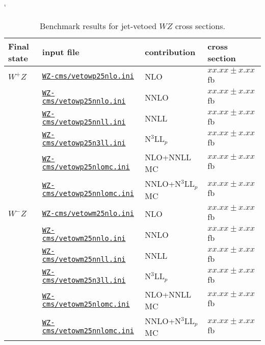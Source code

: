 `\renewcommand{\arraystretch}{1.05}
\begin{table}
\begin{tabular}{llll}
\hline
Final state & input file & contribution & cross section \\
\hline
\hline
$W^+Z$
& \href{\mcfmprocs/Files71/jetveto/cms/vetowp25nlo.ini}{\texttt{WZ-cms/vetowp25nlo.ini}}        & NLO                 & $xx.xx \pm x.xx$ fb \\
& \href{\mcfmprocs/Files71/jetveto/cms/vetowp25nnlo.ini}{\texttt{WZ-cms/vetowp25nnlo.ini}}      & NNLO                & $xx.xx \pm x.xx$ fb \\
& \href{\mcfmprocs/Files71/jetveto/cms/vetowp25nnll.ini}{\texttt{WZ-cms/vetowp25nnll.ini}}      & NNLL                & $xx.xx \pm x.xx$ fb \\
& \href{\mcfmprocs/Files71/jetveto/cms/vetowp25n3ll.ini}{\texttt{WZ-cms/vetowp25n3ll.ini}}      & N$^3$LL$_p$         & $xx.xx \pm x.xx$ fb \\
& \href{\mcfmprocs/Files71/jetveto/cms/vetowp25nlomc.ini}{\texttt{WZ-cms/vetowp25nlomc.ini}}    & NLO+NNLL MC         & $xx.xx \pm x.xx$ fb \\
& \href{\mcfmprocs/Files71/jetveto/cms/vetowp25nnlomc.ini}{\texttt{WZ-cms/vetowp25nnlomc.ini}}  & NNLO+N$^3$LL$_p$ MC & $xx.xx \pm x.xx$ fb \\[2pt]
\hline
$W^-Z$
& \href{\mcfmprocs/Files76/jetveto/cms/vetowm25nlo.ini}{\texttt{WZ-cms/vetowm25nlo.ini}}        & NLO                 & $xx.xx \pm x.xx$ fb \\
& \href{\mcfmprocs/Files76/jetveto/cms/vetowm25nnlo.ini}{\texttt{WZ-cms/vetowm25nnlo.ini}}      & NNLO                & $xx.xx \pm x.xx$ fb \\
& \href{\mcfmprocs/Files76/jetveto/cms/vetowm25nnll.ini}{\texttt{WZ-cms/vetowm25nnll.ini}}      & NNLL                & $xx.xx \pm x.xx$ fb \\
& \href{\mcfmprocs/Files76/jetveto/cms/vetowm25n3ll.ini}{\texttt{WZ-cms/vetowm25n3ll.ini}}      & N$^3$LL$_p$         & $xx.xx \pm x.xx$ fb \\
& \href{\mcfmprocs/Files76/jetveto/cms/vetowm25nlomc.ini}{\texttt{WZ-cms/vetowm25nlomc.ini}}    & NLO+NNLL MC         & $xx.xx \pm x.xx$ fb \\
& \href{\mcfmprocs/Files76/jetveto/cms/vetowm25nnlomc.ini}{\texttt{WZ-cms/vetowm25nnlomc.ini}}  & NNLO+N$^3$LL$_p$ MC & $xx.xx \pm x.xx$ fb \\[2pt]
\end{tabular}
\caption{Benchmark results for jet-vetoed $WZ$ cross sections.}
\label{table:jetveto_WZ-cms}
\end{table}
\renewcommand{\arraystretch}{1.0}
